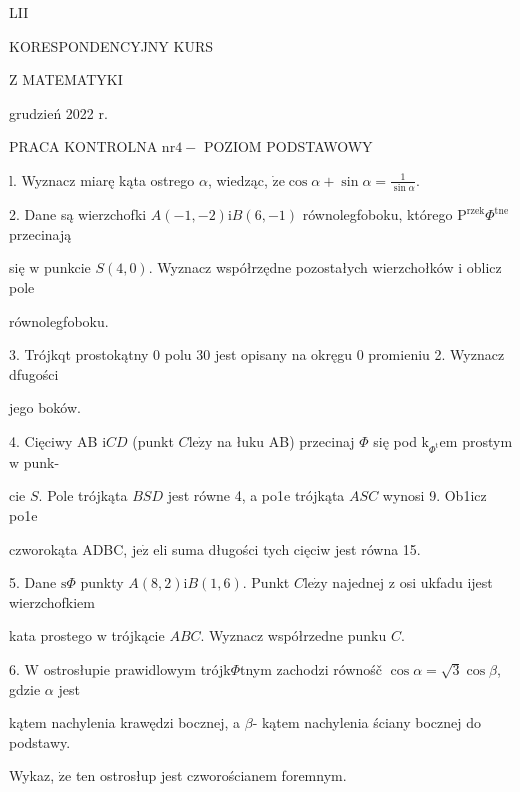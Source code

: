 \documentclass[a4paper,12pt]{article}
\begin{document}
LII

KORESPONDENCYJNY KURS

Z MATEMATYKI

grudzień 2022 r.

PRACA KONTROLNA $\mathrm{n}\mathrm{r} 4-$ POZIOM PODSTAWOWY

l. Wyznacz miarę kąta ostrego $\alpha$, wiedząc, $\dot{\mathrm{z}}\mathrm{e} \displaystyle \cos\alpha+\sin\alpha=\frac{1}{\sin\alpha}.$

2. Dane są wierzchofki $A(-1,-2)\mathrm{i}B(6,-1)$ równolegfoboku, którego $\mathrm{P}^{\mathrm{r}\mathrm{z}\mathrm{e}\mathrm{k}}\Phi^{\mathrm{t}\mathrm{n}\mathrm{e}}$ przecinają

się $\mathrm{w}$ punkcie $S(4,0)$. Wyznacz współrzędne pozostałych wierzchołków $\mathrm{i}$ oblicz pole

równolegfoboku.

3. Trójkqt prostokątny $0$ polu 30 jest opisany na okręgu $0$ promieniu 2. Wyznacz dfugości

jego boków.

4. Cięciwy AB $\mathrm{i}CD$ (punkt $C\mathrm{l}\mathrm{e}\dot{\mathrm{z}}\mathrm{y}$ na łuku AB) przecinaj $\Phi$ się pod $\mathrm{k}_{\Phi^{\mathrm{t}}}\mathrm{e}\mathrm{m}$ prostym $\mathrm{w}$ punk-

cie $S$. Pole trójkąta $BSD$ jest równe 4, a po1e trójkąta $ASC$ wynosi 9. Ob1icz po1e

czworokąta ADBC, $\mathrm{j}\mathrm{e}\dot{\mathrm{z}}$ eli suma długości tych cięciw jest równa 15.

5. Dane $\mathrm{s}\Phi$ punkty $A(8,2)\mathrm{i}B(1,6)$. Punkt $C\mathrm{l}\mathrm{e}\dot{\mathrm{z}}\mathrm{y}$ najednej $\mathrm{z}$ osi ukfadu ijest wierzchofkiem

kata prostego $\mathrm{w}$ trójkącie $ABC$. Wyznacz współrzedne punku $C.$

6. $\mathrm{W}$ ostrosłupie prawidlowym trójk$\Phi$tnym zachodzi równośč $\cos\alpha=\sqrt{3}\cos\beta$, gdzie $\alpha$ jest

kątem nachylenia krawędzi bocznej, a $\beta$- kątem nachylenia ściany bocznej do podstawy.

Wykaz, $\dot{\mathrm{z}}\mathrm{e}$ ten ostrosłup jest czworościanem foremnym.
\end{document}
